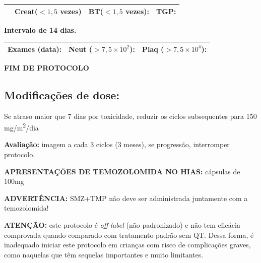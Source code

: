 \documentclass[11pt,a4paper,oldfontcommands]{memoir}
\begin{document}
\begin{center}
\begin{table}[H]
\begin{tabular}{p{1cm}p{5cm}|p{1cm}|p{4.5cm}|p{2cm}}
    \cline{2-5}
    \multicolumn{1}{c|}{\multirow{2}{*}{{}}}&\multicolumn{2}{l|}{Creat(\(<1,5\) vezes)}&{BT(\(<1,5\) vezes):}&{TGP:}
    \\
    \hline
\end{tabular}
\end{table}
\textbf{Intervalo de 14 dias.}
\begin{table}[H]
\begin{tabular}{p{5cm}|p{5cm}|p{4.7cm}}
    \hline
    \textbf{Exames (data):}&{Neut (\(>7,5\times10^2\)):}&{Plaq (\(>7,5\times10^4\)):}
    \\
    \hline
\end{tabular}
\end{table}

\textbf{FIM DE PROTOCOLO}

\end{center}
\subsection{Modificações de dose:}
Se atraso maior que 7 dias por toxicidade, reduzir os ciclos subsequentes para 150 mg/m\textsuperscript{2}/dia

\textbf{Avaliação:} imagem a cada 3 ciclos (3 meses), se progressão, interromper protocolo.

\textbf{APRESENTAÇÕES DE TEMOZOLOMIDA NO HIAS:} cápsulas de 100mg

\textbf{ADVERTÊNCIA:} SMZ+TMP não deve ser administrada juntamente com a temozolomida!

\textbf{ATENÇÃO:} este protocolo é \textit{off-label} (não padronizado) e não tem eficácia comprovada quando comparado com tratamento padrão sem QT. Dessa forma, é inadequado iniciar este protocolo em crianças com risco de complicações graves, como naquelas que têm sequelas importantes e muito limitantes.
\cleardoublepage
\end{document}
